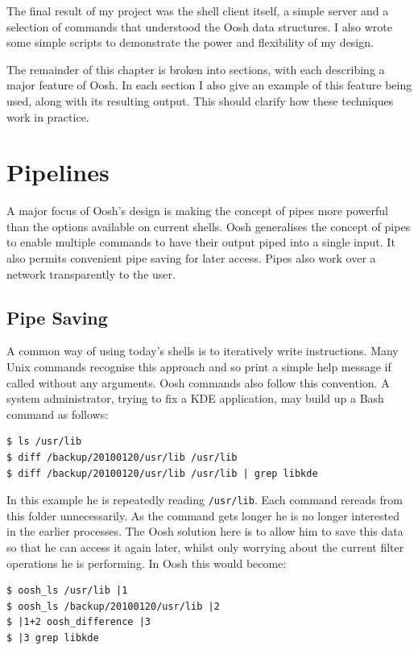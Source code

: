\documentclass[12pt,twoside,notitlepage]{report}
\begin{document}
The final result of my project was the shell client itself, a simple server and
a selection of commands that understood the Oosh data structures. I also wrote
some simple scripts to demonstrate the power and flexibility of my design.

The remainder of this chapter is broken into sections, with each
describing a major feature of Oosh. In each section I also give an example
of this feature being used, along with its resulting output. This
should clarify how these techniques work in practice.

\section{Pipelines}
A major focus of Oosh's design is making the concept of pipes more powerful than
the options available on current shells. Oosh generalises the concept of pipes
to enable multiple commands to have their output piped into a single input. It
also permits convenient pipe saving for later access. Pipes also work over a
network transparently to the user.

\subsection{Pipe Saving}
A common way of using today's shells is to iteratively write
instructions. Many Unix commands recognise this approach and so print
a simple help message if called without any arguments. Oosh commands
also follow this convention. A system
administrator, trying to fix a KDE application, may build up a Bash
command as follows:

\begin{verbatim}
$ ls /usr/lib
$ diff /backup/20100120/usr/lib /usr/lib
$ diff /backup/20100120/usr/lib /usr/lib | grep libkde
\end{verbatim}

In this example he is repeatedly reading {\tt /usr/lib}. Each command
rereads from this folder unnecessarily. As the command gets longer he
is no longer interested in the earlier processes. The Oosh solution
here is to allow him to save this data so that he can access it again
later, whilst only worrying about the current filter operations he is
performing. In Oosh this would become:

\begin{verbatim}
$ oosh_ls /usr/lib |1
$ oosh_ls /backup/20100120/usr/lib |2
$ |1+2 oosh_difference |3
$ |3 grep libkde
\end{verbatim}
\end{document}
